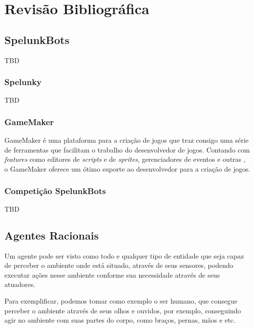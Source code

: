 \chapter{\label{chap:lit-review}Revisão Bibliográfica}

\section{SpelunkBots}

TBD

\subsection{Spelunky}

TBD

\subsection{GameMaker}

GameMaker é uma plataforma para a criação de jogos que traz consigo uma série
de ferramentas que facilitam o trabalho do desenvolvedor de jogos. Contando com
\textit{features} como editores de \textit{scripts} e de \textit{sprites},
gerenciadores de eventos e outras \cite{GMAKER8DOCS}, o GameMaker oferece um
ótimo suporte ao desenvolvedor para a criação de jogos.

\subsection{Competição SpelunkBots}

TBD

\section{Agentes Racionais}

Um agente pode ser visto como todo e qualquer tipo de entidade que seja capaz
de perceber o ambiente onde está situado, através de seus sensores, podendo
executar ações nesse ambiente conforme sua necessidade através de seus atuadores.
\cite{Russell:1995:AIM:193191}

Para exemplificar, podemos tomar como exemplo o ser humano, que consegue
perceber o ambiente através de seus olhos e ouvidos, por exemplo, conseguindo
agir no ambiente com suas partes do corpo, como braços, pernas, mãos e etc.
\cite{Russell:1995:AIM:193191}

